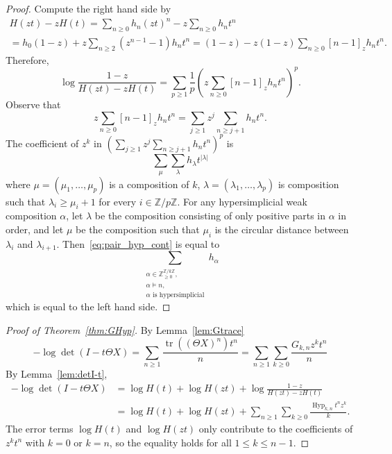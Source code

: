 \documentclass[10pt,a4paper]{amsart}
\theoremstyle{plain}
\theoremstyle{definition}
\newcommand{\Z}{\mathbb{Z}}
\DeclareMathOperator{\Hyp}{Hyp}
\DeclareMathOperator{\tr}{tr}
\begin{document}
\begin{proof}
	Compute the right hand side by
	\begin{multline}
		H(zt) - z H(t) = \sum_{n \geq 0} h_n (zt)^n - z \sum_{n \geq 0} h_n t^n \\ = h_0(1-z) + z \sum_{n \geq 2} (z^{n-1} - 1) h_n t^n = (1-z) - z(1-z) \sum_{n \geq 0} [n-1]_z h_n t^n.
	\end{multline}
	Therefore,
	\begin{equation}
		\log \frac{1-z}{H(zt) - z H(t)} = \sum_{p \geq 1} \frac{1}{p} \left(z \sum_{n \geq 0} [n-1]_z h_n t^n \right)^p.
	\end{equation}
	Observe that
	\begin{equation}
		z \sum_{n \geq 0} [n-1]_z h_n t^n = \sum_{j \geq 1} z^j \sum_{n \geq j+1} h_n t^n.
	\end{equation}
	The coefficient of $ z^k $ in $
		\left(\sum_{j \geq 1} z^j \sum_{n \geq j+1} h_n t^n \right)^p $ is
	\begin{equation}\label{eq:pair_hyp_cont}
		\sum_{\mu} \sum_\lambda h_\lambda t^{|\lambda|}
	\end{equation}
	where $ \mu = (\mu_1,\dots,\mu_p) $ is a composition of $ k $, $ \lambda = (\lambda_1,\dots,\lambda_p)$
	is composition such that $
		\lambda_i \geq \mu_i + 1 $ for every $ i \in \Z/p\Z $. For any hypersimplicial weak composition $\alpha$, let $\lambda$ be the composition consisting of only positive parts in $\alpha$ in order, and let $\mu$ be the composition such that $\mu_i$ is the circular distance between $\lambda_i$ and $\lambda_{i+1}$.
	Then~\eqref{eq:pair_hyp_cont} is equal to
	\[
		\sum_{\substack{\alpha \in \Z_{\geq0}^{\Z/k\Z}, \\ \alpha \models n, \\ \alpha \text{ is hypersimplicial}}} h_\alpha
	\]
	which is equal to the left hand side.
\end{proof}

\begin{proof}[Proof of Theorem~\ref{thm:GHyp}]
	By Lemma~\ref{lem:Gtrace}
	\begin{equation}
		-\log \det(I - t\Theta X) = \sum_{n \geq 1} \frac{\tr((\Theta X)^n)t^n}{n} = \sum_{n \geq 1} \sum_{k \geq 0} \frac{G_{k,n} z^k t^n}{n}
	\end{equation}
	By Lemma~\ref{lem:detI-t},
	\begin{align}
		-\log \det(I - t\Theta X) & = \log H(t) + \log H(zt) + \log \frac{1-z}{H(zt) - zH(t)} \\
		                          & = \log H(t) + \log H(zt) + \sum_{n \geq 1} \sum_{k \geq 0} \frac{\Hyp_{k,n} t^n z^k}{k}.
	\end{align}
	The error terms $\log H(t)$ and $\log H(zt)$ only contribute to the coefficients of $z^k t^n$ with $k=0$ or $k=n$, so the equality holds for all $1 \leq k \leq n-1$.
\end{proof}
\end{document}
